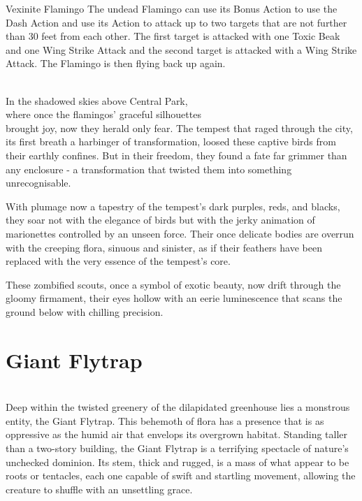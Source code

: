 \begin{DndMonster}[width=0.5\textwidth]{Vexinite Flamingo}
	The undead Flamingo can use its Bonus Action to use the Dash Action and use its Action to attack up to two targets that are not further than 30 feet from each other. The first target is attacked with one Toxic Beak and one Wing Strike Attack and the second target is attacked with a Wing Strike Attack. The Flamingo is then flying back up again.
      
\end{DndMonster}
\vfill\eject\vspace*{2.15cm}\hfill\\
\hspace*{1.75cm}In the shadowed skies above Central Park,\\\hspace*{1.5cm}where once the flamingos' graceful silhouettes\\brought joy, now they herald only fear. The tempest that raged through the city, its first breath a harbinger of transformation, loosed these captive birds from their earthly confines. But in their freedom, they found a fate far grimmer than any enclosure - a transformation that twisted them into something unrecognisable.

With plumage now a tapestry of the tempest's dark purples, reds, and blacks, they soar not with the elegance of birds but with the jerky animation of marionettes controlled by an unseen force. Their once delicate bodies are overrun with the creeping flora, sinuous and sinister, as if their feathers have been replaced with the very essence of the tempest's core.

These zombified scouts, once a symbol of exotic beauty, now drift through the gloomy firmament, their eyes hollow with an eerie luminescence that scans the ground below with chilling precision.

\DungeonSheetGeometry
\section*{Giant Flytrap}
\label{sec:GiantFlytrap}\hfill\\
Deep within the twisted greenery of the dilapidated greenhouse lies a monstrous entity, the Giant Flytrap. This behemoth of flora has a presence that is as oppressive as the humid air that envelops its overgrown habitat. Standing taller than a two-story building, the Giant Flytrap is a terrifying spectacle of nature's unchecked dominion. Its stem, thick and rugged, is a mass of what appear to be roots or tentacles, each one capable of swift and startling movement, allowing the creature to shuffle with an unsettling grace.

